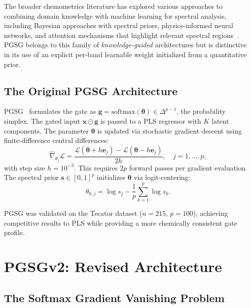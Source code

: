 \documentclass[preprint,12pt,hidelinks]{elsarticle}
\begin{document}
The broader chemometrics literature has explored various approaches to
combining domain knowledge with machine learning for spectral analysis,
including Bayesian approaches with spectral priors, physics-informed neural
networks, and attention mechanisms that highlight relevant spectral
regions~\cite{mishra2022explainable}. PGSG belongs to this family of
\emph{knowledge-guided} architectures but is distinctive in its use of
an explicit per-band learnable weight initialized from a quantitative prior.

\subsection{The Original PGSG Architecture}

PGSG~\cite{pgsg_original} formulates the gate as
$\mathbf{g} = \mathrm{softmax}(\boldsymbol{\theta}) \in \Delta^{p-1}$,
the probability simplex. The gated input $\mathbf{x} \odot \mathbf{g}$
is passed to a PLS regressor with $K$ latent components. The parameter
$\boldsymbol{\theta}$ is updated via stochastic gradient descent using
finite-difference central differences:
\begin{equation}
  \widehat{\nabla}_{\theta_j}\mathcal{L}
  = \frac{\mathcal{L}(\boldsymbol{\theta} + h\mathbf{e}_j)
        - \mathcal{L}(\boldsymbol{\theta} - h\mathbf{e}_j)}{2h},
  \quad j = 1, \ldots, p,
  \label{eq:fd}
\end{equation}
with step size $h = 10^{-3}$. This requires $2p$ forward passes per
gradient evaluation. The spectral prior
$\mathbf{s} \in [0,1]^p$ initializes $\boldsymbol{\theta}$ via logit-centering:
\begin{equation}
  \theta_{0,j} = \log s_j - \frac{1}{p}\sum_{k=1}^p \log s_k.
  \label{eq:logit_center}
\end{equation}

PGSG was validated on the Tecator dataset ($n = 215$, $p = 100$),
achieving competitive results to PLS while providing a more chemically
consistent gate profile.

\section{PGSGv2: Revised Architecture}

\subsection{The Softmax Gradient Vanishing Problem}
\label{sec:grad_vanish}
\end{document}
